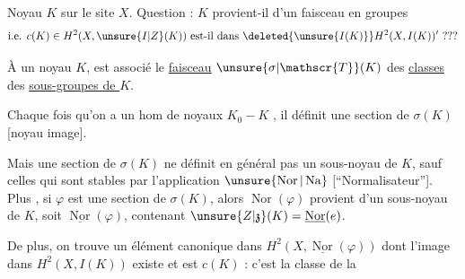 Noyau $K$ sur le site $X$. Question : $K$ provient-il d'un faisceau en groupes
\[
\text{i.e. }c(K)\in H^2(X,\unsure{I|Z}(K))\text{ est-il dans }\deleted{\unsure{I(K)}}H^2(X,I(K))'\text{ ???}
\]


À un noyau $K$, est associé le \uline{faisceau} $\unsure{\sigma|\mathscr{T}}(K)$ des \uline{classes} des \uline{sous-groupes de $K$}. 

Chaque fois qu'on a un hom de noyaux $K_0-K$ , il définit une section de $\sigma(K)$ [noyau image].

 Mais une section de $\sigma(K)$ ne définit en général pas un sous-noyau de $K$, sauf celles qui sont stables par l'application $\unsure{\operatorname{Nor}|\operatorname{Na}}$ [``Normalisateur'']. Plus , si $\varphi$ est une section de $\sigma(K)$, alors $\operatorname{Nor}(\varphi)$ provient d'un sous-noyau de $K$, soit $\underline{\operatorname{Nor}}(\varphi)$, contenant $\unsure{Z|\mathfrak{z}}(K)=\underline{\operatorname{Nor}}(e)$.

 De plus, on trouve un élément canonique dans $H^2(X,\underline{\operatorname{Nor}}(\varphi))$ dont l'image dans $H^2(X,I(K))$ existe et est $c(K)$ :  c'est la classe de la 

